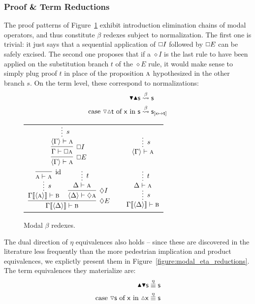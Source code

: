 \subsubsection{Proof \& Term Reductions}
The proof patterns of Figure~\ref{figure:modal_beta_reductions} exhibit introduction elimination chains of modal operators, and thus constitute $\beta$ redexes subject to normalization.
The first one is trivial: it just says that a sequential application of $\bx I$ followed by $\bx E$ can be safely excised.
The second one proposes that if a $\diamond I$ is the last rule to have been applied on the substitution branch $t$ of the $\diamond E$ rule, it would make sense to simply plug proof $t$ in place of the proposition $\normalfont\textsc{a}$ hypothesized in the other  branch $s$.
On the term level, these correspond to normalizations:
\begin{align}
\boxelim \boxintro \term{s} & \bred \term{s}\\
\cterm{case \term{\diaelim \diaintro t} of \term{x} in \term{s}} & \bred \term{s}_{[\term{x} \mapsto \term{t}]}
\end{align}

\begin{figure}
	\centering
		\begin{tabularx}{0.85\textwidth}{@{}c@{\qquad}c@{\qquad}c@{}}
		$\infer[\bx E]{\bracket{\Gamma} \vdash \prop{a}}{
			\infer[\bx I]{\Gamma \vdash \bx \prop{a}}{
				\infer*[s]{\bracket{\Gamma} \vdash  \prop{a}}{}
			}
		}
		$
		&
		\raisebox{10pt}{$\implies$}
		&
		$\infer*[s]{\bracket{\Gamma} \vdash \prop{a}}{}
		$\\[\midsep]
		$\infer[\diamond E]{\Gamma\ctx{\bracket{\Delta}} \vdash \prop{b}}{
			\infer*[s]{\Gamma\ctx{\bracket{\prop{a}}} \vdash \prop{b}}{
				\infer[\Ax]{\prop{a} \vdash \prop{a}}{}}
			&
			\infer[\diamond I]{\bracket{\Delta} \vdash \diamond\prop{a}}{
				\infer*[t]{\Delta \vdash \prop{a}}{}
			}
		}
		$
		&
		\raisebox{20pt}{$\implies$}
		&
		$\infer*[s]{\Gamma\ctx{\bracket{\Delta}} \vdash \prop{b}}{
			\infer*[t]{\Delta \vdash \prop{a}}{}
		}
		$
		\end{tabularx}
		\caption{Modal $\beta$ redexes.}
		\label{figure:modal_beta_reductions}
\end{figure}

The dual direction of $\eta$ equivalences also holds -- since these are discovered in the literature less frequently than the more pedestrian implication and product equivalences, we explictly present them in Figure~\ref{figure:modal_eta_reductions}.
The term equivalences they materialize are:
\begin{align}
\boxintro \boxelim \term{s} & \overset{\eta}{\equiv} \term{s}\\
\cterm{case \term{\diaelim{s}} of \term{x} in \term{\diaintro{x}}} & \overset{\eta}{\equiv} \term{s}
\end{align}

